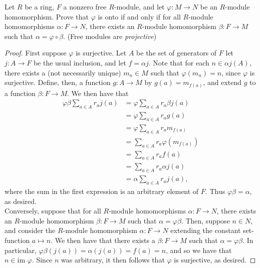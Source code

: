 \documentclass[12pt]{article}
\newenvironment{problem}[2][Problem]{\begin{trivlist}
\item[\hskip \labelsep {\bfseries #1}\hskip \labelsep {\bfseries #2.}]}{\end{trivlist}}
\newcommand{\im}{\text{im }}
\theoremstyle{remark}
\begin{document}
\begin{problem}{6.9}
  Let $R$ be a ring, $F$ a nonzero free $R$-module, and let 
  $\varphi:M\to N$ be an $R$-module homomorphism.
  Prove that $\varphi$ is onto if and only if for all $R$-module homomorphisms
  $\alpha:F\to N$, there exists an $R$-module homomorphism $\beta:F\to M$
  such that $\alpha=\varphi\circ\beta$.
  (Free modules are \textit{projective})
\end{problem}
\begin{proof}
  First suppose $\varphi$ is surjective.
  Let $A$ be the set of generators of $F$ let $j:A\to F$ be the usual 
  inclusion, and let $f=\alpha j$.
  Note that for each $n\in\alpha j(A)$, there exists a (not necessarily unique)
  $m_n\in M$ such that $\varphi(m_n)=n$, since $\varphi$ is surjective.
  Define, then, a function $g:A\to M$ by $g(a) = m_{f(a)}$, and extend
  $g$ to a function $\beta:F\to M$.
  We then have that
  \begin{align*}
    \varphi\beta\sum_{a\in A} r_aj(a) &= \varphi\sum_{a\in A}r_a\beta j(a) \\
    &= \varphi\sum_{a\in A}r_ag(a) \\
    &= \varphi\sum_{a\in A}r_am_{f(a)} \\
    &= \sum_{a\in A}r_a\varphi(m_{f(a)}) \\
    &= \sum_{a\in A}r_af(a) \\
    &= \sum_{a\in A}r_a\alpha j(a) \\
    &= \alpha\sum_{a\in A}r_aj(a), 
  \end{align*}
  where the sum in the first expression is an arbitrary element of $F$.
  Thus $\varphi\beta=\alpha$, as desired.\\
  \indent Conversely, suppose that for all $R$-module homomorphisms
  $\alpha:F\to N$, there exists an $R$-module homomorphism $\beta:F\to M$
  such that $\alpha=\varphi\beta$.
  Then, suppose $n\in N$, and consider the $R$-module homomorphism
  $\alpha:F\to N$ extending the constant set-function $a\mapsto n$.
  We then have that there exists a $\beta:F\to M$ such that 
  $\alpha=\varphi\beta$.
  In particular, $\varphi\beta(j(a)) = \alpha(j(a)) = f(a) = n$,
  and so we have that $n\in\im\varphi$.
  Since $n$ was arbitrary, it then follows that $\varphi$ is surjective,
  as desired.
\end{proof}
\end{document}
